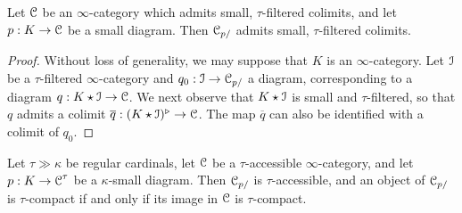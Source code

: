 \begin{lemma}\label{sturm}
Let $\operatorname{\mathcal{C}}$ be an $\infty$-category which admits small, $\tau$-filtered colimits, and let
$p: K \rightarrow \operatorname{\mathcal{C}}$ be a small diagram. Then $\operatorname{\mathcal{C}}_{p/}$ admits small, $\tau$-filtered colimits.
\end{lemma}

\begin{proof}
Without loss of generality, we may suppose that $K$ is an $\infty$-category. Let $\operatorname{\mathcal{I}}$ be a $\tau$-filtered $\infty$-category and $q_0: \operatorname{\mathcal{I}} \rightarrow \operatorname{\mathcal{C}}_{p/}$ a diagram, corresponding to
a diagram $q: K \star \operatorname{\mathcal{I}} \rightarrow \operatorname{\mathcal{C}}$. We next observe that $K \star \operatorname{\mathcal{I}}$ is small and $\tau$-filtered, so that $q$ admits a colimit $\overline{q}: (K \star \operatorname{\mathcal{I}})^{\triangleright}
\rightarrow \operatorname{\mathcal{C}}$. The map $\overline{q}$ can also be identified with a colimit of $q_0$.
\end{proof}

\begin{proposition}\label{accessforwardslice}
Let $\tau \gg \kappa$ be regular cardinals, let $\operatorname{\mathcal{C}}$ be a $\tau$-accessible $\infty$-category, and let $p: K \rightarrow \operatorname{\mathcal{C}}^{\tau}$ be a $\kappa$-small diagram. Then
$\operatorname{\mathcal{C}}_{p/}$ is $\tau$-accessible, and an object of $\operatorname{\mathcal{C}}_{p/}$ is $\tau$-compact if and only if
its image in $\operatorname{\mathcal{C}}$ is $\tau$-compact.
\end{proposition}


